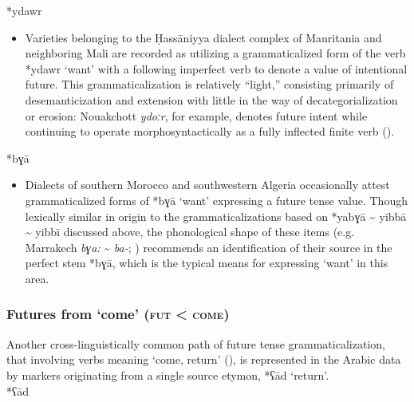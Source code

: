 \documentclass[output=paper]{langsci/langscibook}
\begin{document}
*ydawr

\begin{itemize}

  \item[]
Varieties belonging to the Ḥassāniyya dialect complex of Mauritania and neighboring Mali are recorded as utilizing a grammaticalized form of the verb *ydawr ‘want’ with a following imperfect verb to denote a value of intentional future. This grammaticalization is relatively “light,” consisting primarily of desemanticization and extension with little in the way of decategorialization or erosion: Nouakchott \textit{ydoːr}, for example, denotes future intent while continuing to operate morphosyntactically as a fully inflected finite verb (\citealt{Taine-Cheikh2011hass}).
\end{itemize}
 
*bɣā

\begin{itemize}

  \item[]
Dialects of southern Morocco and southwestern Algeria occasionally attest grammaticalized forms of *bɣā ‘want’ expressing a future tense value. Though lexically similar in origin to the grammaticalizations based on *yabɣā {\textasciitilde} yibbā {\textasciitilde} yibbī discussed above, the phonological shape of these items (e.g. Marrakech \textit{bɣa:} {\textasciitilde} \textit{ba-}; \citealt{Sánchez2014}) recommends an identification of their source in the perfect stem *bɣā, which is the typical means for expressing ‘want’ in this area.
\end{itemize}

\subsubsection{ Futures from ‘come’ (\textsc{fut} < \textsc{come})}

Another cross-linguistically common path of future tense grammaticalization, that involving verbs meaning ‘come, return’ (\citealt{Bybee1994,HeineKuteva2002}), is represented in the Arabic data by markers originating from a single source etymon, *ʕād ‘return’.\\
 
*ʕād
\end{document}
